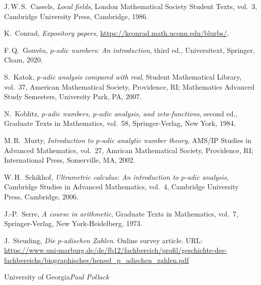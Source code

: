 \renewcommand\refname{\normalsize Suggestions for further reading}
\begin{thebibliography}{11}

 {J.\,W.\,S.}~Cassels, \emph{Local fields}, London Mathematical Society Student Texts, vol.~3, Cambridge University Press, Cambridge, 1986.

 K.~Conrad, \emph{Expository papers}, \url{https://kconrad.math.uconn.edu/blurbs/}.

{F.\,Q.}~Gouv\^{e}a, \emph{{$p$}-adic numbers: An introduction}, third ed., Universitext, Springer, Cham, 2020.

 S.~Katok, \emph{{$p$}-adic analysis compared with real}, Student Mathematical Library, vol.~37, American Mathematical Society, Providence, RI; Mathematics Advanced Study Semesters, University Park, PA, 2007. 

N.~Koblitz, \emph{{$p$}-adic numbers, {$p$}-adic analysis, and zeta-functions}, second ed., Graduate Texts in Mathematics, vol.~58, Springer-Verlag, New York, 1984. 


 M.\,R.~Murty, \emph{Introduction to {$p$}-adic analytic number theory}, AMS/IP Studies in Advanced Mathematics, vol.~27, Amrican Mathematical Society, Providence, RI; International Press, Somerville, MA, 2002. 

 W.\,H.~Schikhof, \emph{Ultrametric calculus:  An introduction to $p$-adic analysis}, Cambridge Studies in Advanced Mathematics, vol.~4, Cambridge University Press, Cambridge, 2006.

 J.-P.~Serre, \emph{A course in arithmetic}, Graduate Texts in Mathematics, vol.~7, 
Springer-Verlag, New York-Heidelberg, 1973.

 J.~Steuding, \emph{Die $p$-adischen Zahlen}. Online survey article. URL:
\url{https://www.uni-marburg.de/de/fb12/fachbereich/profil/geschichte-des-fachbereichs/biographisches/hensel_p_adischen_zahlen.pdf}

\end{thebibliography} 

\vspace{1cm}
\begin{flushright}\noindent
University of Georgia\hfill {\it Paul Pollack}
\end{flushright}
